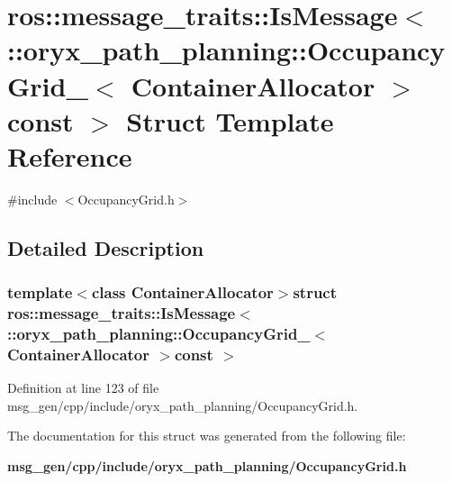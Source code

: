 \section{ros\-:\-:message\-\_\-traits\-:\-:\-Is\-Message$<$ \-:\-:oryx\-\_\-path\-\_\-planning\-:\-:\-Occupancy\-Grid\-\_\-$<$ \-Container\-Allocator $>$const $>$ \-Struct \-Template \-Reference}
\label{structros_1_1message__traits_1_1IsMessage_3_01_1_1oryx__path__planning_1_1OccupancyGrid___3_01Coa7ac41d9ab8ac5873aa24172bd39fb77}


{\ttfamily \#include $<$\-Occupancy\-Grid.\-h$>$}



\subsection{\-Detailed \-Description}
\subsubsection*{template$<$class Container\-Allocator$>$struct ros\-::message\-\_\-traits\-::\-Is\-Message$<$ \-::oryx\-\_\-path\-\_\-planning\-::\-Occupancy\-Grid\-\_\-$<$ Container\-Allocator $>$const  $>$}



\-Definition at line 123 of file msg\-\_\-gen/cpp/include/oryx\-\_\-path\-\_\-planning/\-Occupancy\-Grid.\-h.



\-The documentation for this struct was generated from the following file\-:\begin{DoxyCompactItemize}
\item 
{\bf msg\-\_\-gen/cpp/include/oryx\-\_\-path\-\_\-planning/\-Occupancy\-Grid.\-h}\end{DoxyCompactItemize}
